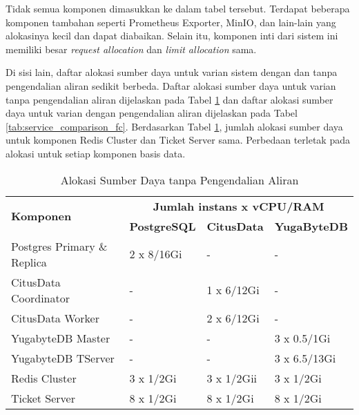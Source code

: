 Tidak semua komponen dimasukkan ke dalam tabel tersebut. Terdapat beberapa komponen tambahan seperti Prometheus Exporter, MinIO, dan lain-lain yang alokasinya kecil dan dapat diabaikan. Selain itu, komponen inti dari sistem ini memiliki besar \textit{request allocation} dan \textit{limit allocation} sama.

Di sisi lain, daftar alokasi sumber daya untuk varian sistem dengan dan tanpa pengendalian aliran sedikit berbeda. Daftar alokasi sumber daya untuk varian tanpa pengendalian aliran dijelaskan pada Tabel \ref{tab:nofc-allocation} dan daftar alokasi sumber daya untuk varian dengan pengendalian aliran dijelaskan pada Tabel \ref{tab:service_comparison_fc}. Berdasarkan Tabel \ref{tab:nofc-allocation}, jumlah alokasi sumber daya untuk komponen Redis Cluster dan Ticket Server sama. Perbedaan terletak pada alokasi untuk setiap komponen basis data.

\begin{table}[H]
    \centering
    \caption{Alokasi Sumber Daya tanpa Pengendalian Aliran}
    \label{tab:nofc-allocation}
    \begin{tabular}{|l|l|l|l|}
        \hline
        \multirow{2}{*}{\textbf{Komponen}} & \multicolumn{3}{c|}{\textbf{Jumlah instans x vCPU/RAM}}                                            \\
        \cline{2-4}
                                           & \textbf{PostgreSQL}                                     & \textbf{CitusData} & \textbf{YugaByteDB} \\
        \hline
        Postgres Primary \& Replica        & 2 x 8/16Gi                                              & -                  & -                   \\ \hline
        CitusData Coordinator              & -                                                       & 1 x 6/12Gi         & -                   \\ \hline
        CitusData Worker                   & -                                                       & 2 x 6/12Gi         & -                   \\ \hline
        YugabyteDB Master                  & -                                                       & -                  & 3 x 0.5/1Gi         \\ \hline
        YugabyteDB TServer                 & -                                                       & -                  & 3 x 6.5/13Gi        \\ \hline
        Redis Cluster                      & 3 x 1/2Gi                                               & 3 x 1/2Gii         & 3 x 1/2Gi           \\ \hline
        Ticket Server                      & 8 x 1/2Gi                                               & 8 x 1/2Gi          & 8 x 1/2Gi           \\ \hline
    \end{tabular}
\end{table}

